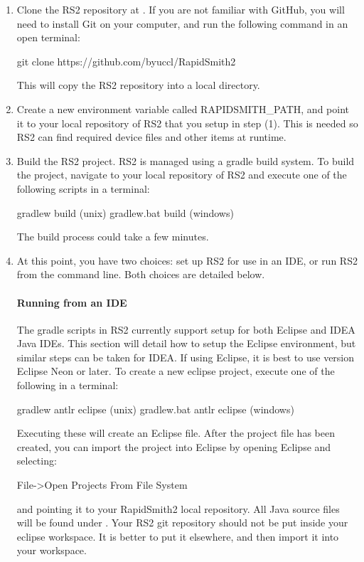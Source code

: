 \begin{enumerate}
  \item Clone the RS2 repository at
  {}. If you are not
  familiar with GitHub, you will need to install Git on your computer, and run the
  following command in an open terminal: 
\vspace{-0.07in}
\begin{code}
git clone https://github.com/byuccl/RapidSmith2
\end{code} 
  \noindent This will copy the RS2 repository into a local directory.
  \item Create a new environment variable called RAPIDSMITH\_PATH, and point it
  to your local repository of RS2 that you setup in step (1). This is needed so
  RS2 can find required device files and other items at runtime.
  \item Build the  RS2 project. RS2 is managed using a gradle build system.
  To build the project, navigate to your local repository of RS2 and execute one
  of the following scripts in a terminal:
  \begin{code}
	gradlew build (unix)
	gradlew.bat build (windows)
  \end{code}
  The build process could take a few minutes.
  \item At this point, you have two choices: set up RS2 for use in an IDE, or
  run RS2 from the command line. Both choices are detailed below.
  \paragraph{Running from an IDE} The gradle scripts in RS2 currently support
  setup for both Eclipse and IDEA Java IDEs. This section will detail how to
  setup the Eclipse environment, but similar steps can be taken for IDEA. If
  using Eclipse, it is best to use version Eclipse Neon or later. To create a
  new eclipse project, execute one of the following in a terminal:
  \begin{code}
	gradlew antlr eclipse (unix)       
	gradlew.bat antlr eclipse (windows)
  \end{code}
  Executing these will create an Eclipse  file. After the project
  file has been created, you can import the project into Eclipse by opening
  Eclipse and selecting:
  \begin{code}
	File->Open Projects From File System 
  \end{code}
  and pointing it to your RapidSmith2 local repository. All Java source files
  will be found under .  Your RS2 git repository
  should not be put inside your eclipse workspace. It is better to put it
  elsewhere, and then import it into your workspace.

\end{enumerate}

